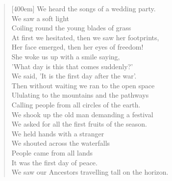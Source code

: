\documentclass{article}
\newcommand{\attrib}[1]{%
  \nopagebreak{\raggedleft\footnotesize #1\par}}
\begin{document}

\settowidth{\versewidth}{At first we hesitated, then we saw her footprints,}
\begin{verse}[400em]
  \Large{We heard the songs of a wedding party.} \\
  \Large{We saw a soft light}\\
  \Large{Coiling round the young blades of grass}\\
  \Large{At first we hesitated, then we saw her footprints,}\\
  \Large{Her face emerged, then her eyes of freedom!}\\
  \Large{She woke us up with a smile saying,}\\
  \Large{'What day is this that comes suddenly?'}\\
  \Large{We said, 'It is the first day after the war'.}\\
  \Large{Then without waiting we ran to the open space}\\
  \Large{Ululating to the mountains and the pathways}\\
  \Large{Calling people from all circles of the earth.}\\
  \Large{We shook up the old man demanding a festival}\\
  \Large{We asked for all the first fruits of the season.}\\
  \Large{We held hands with a stranger}\\
  \Large{We shouted across the waterfalls}\\
  \Large{People came from all lands}\\
  \Large{It was the first day of peace.}\\
  \Large{We saw our Ancestors travelling tall on the horizon.}
\end{verse}
\attrib{\Large{Mazisi Kunene}}
\end{document}
